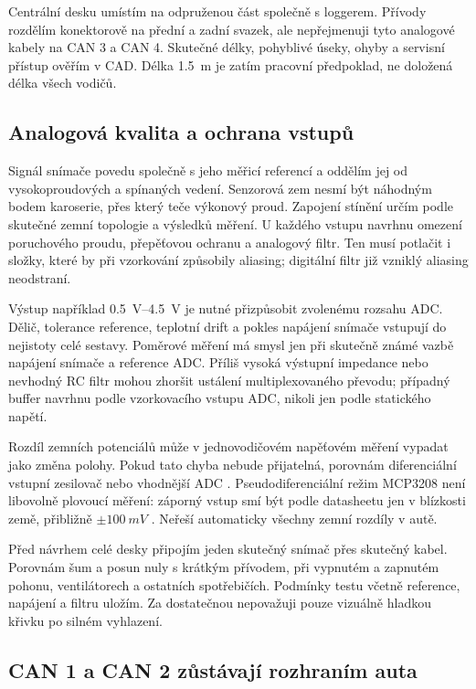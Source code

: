 Centrální desku umístím na odpruženou část společně s loggerem. Přívody
rozdělím konektorově na přední a zadní svazek, ale nepřejmenuji tyto
analogové kabely na CAN 3 a CAN 4. Skutečné délky, pohyblivé úseky,
ohyby a servisní přístup ověřím v CAD. Délka \SI{1.5}{m} je zatím
pracovní předpoklad, ne doložená délka všech vodičů.

\subsection{Analogová kvalita a ochrana vstupů}

Signál snímače povedu společně s jeho měřicí referencí a oddělím jej
od vysokoproudových a spínaných vedení. Senzorová zem nesmí být
náhodným bodem karoserie, přes který teče výkonový proud. Zapojení
stínění určím podle skutečné zemní topologie a výsledků měření.
U každého vstupu navrhnu omezení poruchového proudu, přepěťovou ochranu
a analogový filtr. Ten musí potlačit i složky, které by při vzorkování
způsobily aliasing; digitální filtr již vzniklý aliasing neodstraní.

Výstup například \SIrange{0.5}{4.5}{V} je nutné přizpůsobit zvolenému
rozsahu ADC. Dělič, tolerance reference, teplotní drift a pokles
napájení snímače vstupují do nejistoty celé sestavy. Poměrové měření
má smysl jen při skutečně známé vazbě napájení snímače a reference ADC.
Příliš vysoká výstupní impedance nebo nevhodný RC filtr mohou zhoršit
ustálení multiplexovaného převodu; případný buffer navrhnu podle
vzorkovacího vstupu ADC, nikoli jen podle statického napětí.

Rozdíl zemních potenciálů může v jednovodičovém napěťovém měření
vypadat jako změna polohy. Pokud tato chyba nebude přijatelná,
porovnám diferenciální vstupní zesilovač nebo vhodnější ADC
\cite{adi-vstupy-adc}. Pseudodiferenciální režim MCP3208 není
libovolně plovoucí měření: záporný vstup smí být podle datasheetu jen
v blízkosti země, přibližně \(\pm\SI{100}{mV}\)
\cite{mcp3208-adc}. Neřeší automaticky všechny zemní rozdíly v autě.

Před návrhem celé desky připojím jeden skutečný snímač přes skutečný
kabel. Porovnám šum a posun nuly s krátkým přívodem, při vypnutém
a zapnutém pohonu, ventilátorech a ostatních spotřebičích. Podmínky
testu včetně reference, napájení a filtru uložím. Za dostatečnou
nepovažuji pouze vizuálně hladkou křivku po silném vyhlazení.

\subsection{CAN 1 a CAN 2 zůstávají rozhraním auta}

